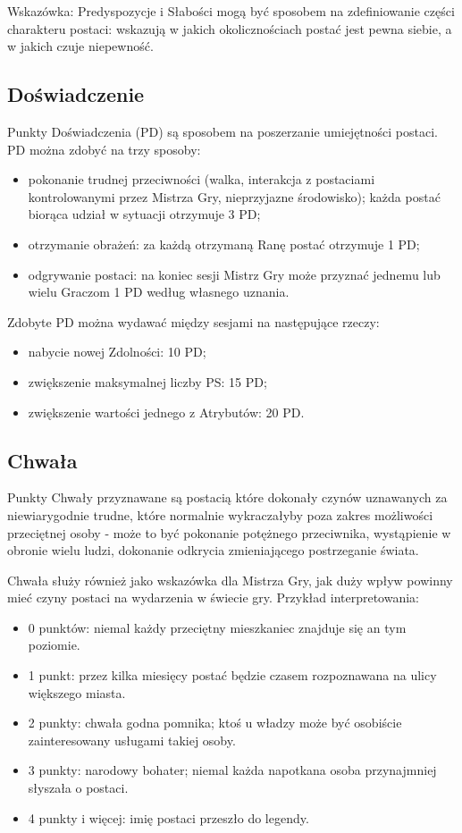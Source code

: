 \documentclass[10pt,a4paper]{book}
\begin{document}
\begin{multicols}{2}
Wskazówka: Predyspozycje i Słabości mogą być sposobem na zdefiniowanie części charakteru postaci: wskazują w jakich okolicznościach postać jest pewna siebie, a w jakich czuje niepewność.


\subsection*{Doświadczenie}
Punkty Doświadczenia (PD) są sposobem na poszerzanie umiejętności postaci. PD można zdobyć na trzy sposoby:
\begin{itemize}
	\item pokonanie trudnej przeciwności (walka, interakcja z postaciami kontrolowanymi przez Mistrza Gry, nieprzyjazne środowisko); każda postać biorąca udział w sytuacji otrzymuje 3 PD;
	\item otrzymanie obrażeń: za każdą otrzymaną Ranę postać otrzymuje 1 PD;
	\item odgrywanie postaci: na koniec sesji Mistrz Gry może przyznać jednemu lub wielu Graczom 1 PD według własnego uznania.
\end{itemize}

Zdobyte PD można wydawać między sesjami na następujące rzeczy:
\begin{itemize}
	\item nabycie nowej Zdolności: 10 PD;
	\item zwiększenie maksymalnej liczby PS: 15 PD;
	\item zwiększenie wartości jednego z Atrybutów: 20 PD.
\end{itemize}


\subsection*{Chwała}
Punkty Chwały przyznawane są postacią które dokonały czynów uznawanych za niewiarygodnie trudne, które normalnie wykraczałyby poza zakres możliwości przeciętnej osoby - może to być pokonanie potężnego przeciwnika, wystąpienie w obronie wielu ludzi, dokonanie odkrycia zmieniającego postrzeganie świata.

Chwała służy również jako wskazówka dla Mistrza Gry, jak duży wpływ powinny mieć czyny postaci na wydarzenia w świecie gry. Przykład interpretowania:
\begin{itemize}
	\item 0 punktów: niemal każdy przeciętny mieszkaniec znajduje się an tym poziomie.
	\item 1 punkt: przez kilka miesięcy postać będzie czasem rozpoznawana na ulicy większego miasta.
	\item 2 punkty: chwała godna pomnika; ktoś u władzy może być osobiście zainteresowany usługami takiej osoby.
	\item 3 punkty: narodowy bohater; niemal każda napotkana osoba przynajmniej słyszała o postaci.
	\item 4 punkty i więcej: imię postaci przeszło do legendy.
\end{itemize}


\end{multicols}
\end{document}
